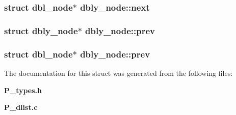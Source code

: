 \subsubsection{\setlength{\rightskip}{0pt plus 5cm}struct dbl\_\-node$\ast$ dbly\_\-node::next}\label{structdbly__node_m2}


\subsubsection{\setlength{\rightskip}{0pt plus 5cm}struct dbly\_\-node$\ast$ dbly\_\-node::prev}\label{structdbly__node_m4}


\subsubsection{\setlength{\rightskip}{0pt plus 5cm}struct dbl\_\-node$\ast$ dbly\_\-node::prev}\label{structdbly__node_m1}




The documentation for this struct was generated from the following files:\begin{CompactItemize}
\item 
{\bf P\_\-types.h}\item 
{\bf P\_\-dlist.c}\end{CompactItemize}
